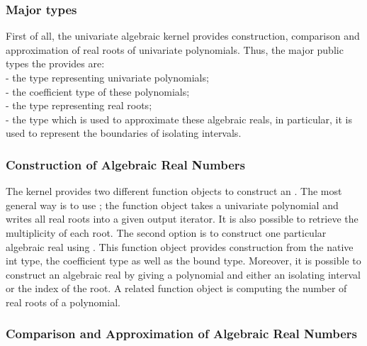\subsubsection{Major types}
First of all, the univariate algebraic kernel provides construction, comparison and 
approximation of real roots of univariate polynomials. 
Thus, the major public types the  provides are: \\
 - the type representing univariate polynomials;\\
 - the coefficient type of these polynomials; \\
 - the type representing real roots;\\
 - the type which is used to approximate these algebraic reals, 
in particular, it is used to represent the boundaries of isolating intervals. \\

\subsubsection{Construction of Algebraic Real Numbers }

The kernel provides two different function objects to construct an
. The most general way
is to use ; the function object
takes a univariate polynomial and writes all real roots into a given
output iterator. It is also possible to retrieve the multiplicity of
each root. The second option is to construct one particular algebraic
real using .
This function object provides construction from the native int type, the
coefficient type as well as the bound type.  Moreover, it is possible
to construct an algebraic real by giving a polynomial and either an
isolating interval or the index of the root. A related function object
is  computing the number
of real roots of a polynomial.



\subsubsection{ Comparison and Approximation of Algebraic Real Numbers}

